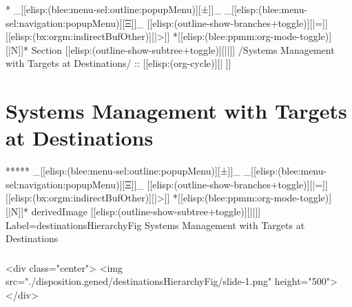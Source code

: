 \begin{whenOrg}
*  _[[elisp:(blee:menu-sel:outline:popupMenu)][±]]_ _[[elisp:(blee:menu-sel:navigation:popupMenu)][Ξ]]_ [[elisp:(outline-show-branches+toggle)][|=]] [[elisp:(bx:orgm:indirectBufOther)][|>]] *[[elisp:(blee:ppmm:org-mode-toggle)][|N]]*  Section    [[elisp:(outline-show-subtree+toggle)][||]]   /Systems Management with Targets at Destinations/ ::  [[elisp:(org-cycle)][| ]]
\end{whenOrg}

\section{Systems Management with Targets at Destinations}


\begin{whenOrg}
*****  _[[elisp:(blee:menu-sel:outline:popupMenu)][±]]_ _[[elisp:(blee:menu-sel:navigation:popupMenu)][Ξ]]_ [[elisp:(outline-show-branches+toggle)][|=]] [[elisp:(bx:orgm:indirectBufOther)][|>]] *[[elisp:(blee:ppmm:org-mode-toggle)][|N]]*  derivedImage [[elisp:(outline-show-subtree+toggle)][||]] Label=destinationsHierarchyFig Systems Management with Targets at Destinations
\end{whenOrg}

\begin{htmlonly}

\begin{frame}[fragile,plain,label=destinationsHierarchyFig]
    \frametitle{}
    \framesubtitle{}
    \begin{rawhtml}
<div class="center">
<img src="./disposition.gened/destinationsHierarchyFig/slide-1.png" height="500">
</div>
    \end{rawhtml}
\end{frame}
\end{htmlonly}


